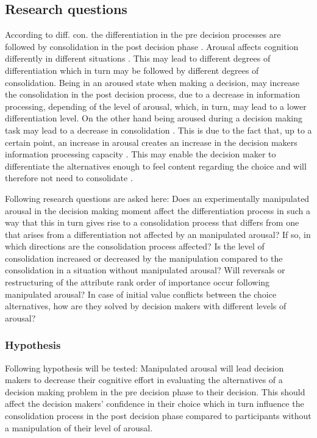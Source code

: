 \subsection{Research questions}

According to diff. con. the differentiation  in the pre decision
processes are followed by consolidation in the post decision phase
\parencite{Svensson95}.  Arousal affects cognition differently in  different
situations \parencite{FiskeTaylor91}.  This may lead to different degrees
of differentiation which in turn may be followed by different degrees
of consolidation.  Being in an aroused state when making a decision,
may increase the consolidation in the post decision process, due to a
decrease in information processing, depending of the level of arousal,
which, in turn, may lead to a lower differentiation level.  On the
other hand being aroused during a decision making task may lead to a
decrease in consolidation \parencite{Svensson95}. This is due to  the fact
that, up to a certain point, an increase in arousal creates an
increase in the decision makers information processing capacity
\parencite{Easterbrook59}. This may enable the decision maker to
differentiate the alternatives enough to feel content regarding the
choice and will therefore not need to consolidate \parencite{svensson92b}.

Following research questions are asked here:  Does an experimentally
manipulated arousal in the decision making moment affect the
differentiation process in such a way that this in turn gives rise to
a consolidation process that differs from one that arises from a
differentiation not affected by an manipulated arousal?  If so, in
which directions are the consolidation process affected? Is the level
of consolidation increased or decreased by the manipulation compared
to the consolidation in a situation without manipulated arousal?  Will
reversals or restructuring of the attribute rank order of importance
occur following manipulated arousal? In case of initial value
conflicts between the choice alternatives,  how are they solved by
decision makers with different levels of arousal?

\subsubsection{Hypothesis} Following hypothesis will be tested: Manipulated arousal
will lead decision makers to decrease their cognitive effort in
evaluating the alternatives of a decision making problem in the pre
decision phase to their decision.  This should affect the decision
makers' confidence in their choice which in turn influence the
consolidation process in the post decision phase compared to
participants without a manipulation of their level of arousal.


